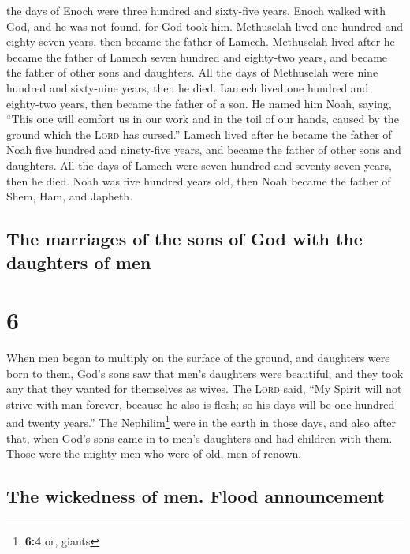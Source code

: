 the days of Enoch were three hundred and sixty-five years.
 Enoch walked with God, and he was not found, for God
took him.  Methuselah lived one hundred and eighty-seven
years, then became the father of Lamech.  Methuselah
lived after he became the father of Lamech seven hundred and eighty-two
years, and became the father of other sons and daughters.
 All the days of Methuselah were nine hundred and
sixty-nine years, then he died.  Lamech lived one hundred
and eighty-two years, then became the father of a son. 
He named him Noah, saying, ``This one will comfort us in our work and in
the toil of our hands, caused by the ground which the \textsc{Lord} has
cursed.''  Lamech lived after he became the father of
Noah five hundred and ninety-five years, and became the father of other
sons and daughters.  All the days of Lamech were seven
hundred and seventy-seven years, then he died.  Noah was
five hundred years old, then Noah became the father of Shem, Ham, and
Japheth.

\hypertarget{the-marriages-of-the-sons-of-god-with-the-daughters-of-men}{%
\subsection{The marriages of the sons of God with the daughters of
men}\label{the-marriages-of-the-sons-of-god-with-the-daughters-of-men}}

\hypertarget{section-5}{%
\section{6}\label{section-5}}

 When men began to multiply on the surface of the ground,
and daughters were born to them,  God's sons saw that
men's daughters were beautiful, and they took any that they wanted for
themselves as wives.  The \textsc{Lord} said, ``My Spirit
will not strive with man forever, because he also is flesh; so his days
will be one hundred and twenty years.''  The
Nephilim\footnote{\textbf{6:4} or, giants} were in the earth in those
days, and also after that, when God's sons came in to men's daughters
and had children with them. Those were the mighty men who were of old,
men of renown.

\hypertarget{the-wickedness-of-men.-flood-announcement}{%
\subsection{The wickedness of men. Flood
announcement}\label{the-wickedness-of-men.-flood-announcement}}


